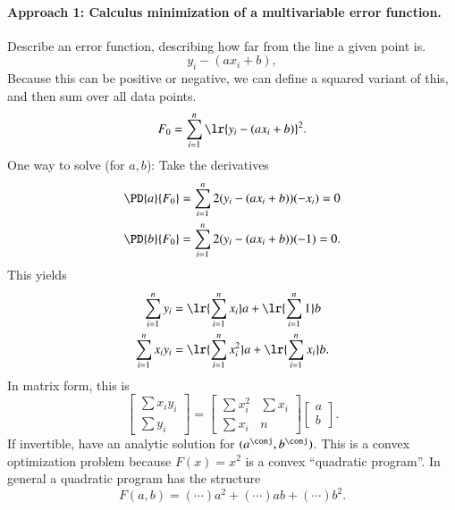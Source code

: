 \paragraph{Approach 1:  Calculus minimization of a multivariable error function.}
Describe an error function, describing how far from the line a given point is.
\begin{equation}\label{eqn:L1introduction:100}
y_i - (a x_i + b),
\end{equation}
Because this can be positive or negative, we can define a squared variant of this, and then sum over all data points.
\begin{equation}\label{eqn:L1introduction:120}
F_0 = \sum_{i=1}^n \lr{ y_i - (a x_i + b) }^2.
\end{equation}
One way to solve (for \( a, b \)): Take the derivatives
\begin{equation}\label{eqn:L1introduction:140}
\begin{aligned}
\PD{a}{F_0} &= \sum_{i=1}^n 2 ( y_i - (a x_i + b) )(-x_i) = 0 \\
\PD{b}{F_0} &= \sum_{i=1}^n 2 ( y_i - (a x_i + b) )(-1) = 0.
\end{aligned}
\end{equation}
%
This yields
\begin{equation}\label{eqn:L1introduction:160}
\begin{aligned}
\sum_{i = 1}^n y_i     &= \lr{\sum_{i = 1}^n x_i} a + \lr{\sum_{i = 1}^n 1} b \\
\sum_{i = 1}^n x_i y_i &= \lr{\sum_{i = 1}^n x_i^2} a + \lr{\sum_{i = 1}^n x_i} b.
\end{aligned}
\end{equation}
In matrix form, this is
\begin{equation}\label{eqn:L1introduction:180}
\begin{bmatrix}
\sum x_i y_i \\
\sum y_i
\end{bmatrix}
=
\begin{bmatrix}
\sum x_i^2 & \sum x_i \\
\sum x_i & n
\end{bmatrix}
\begin{bmatrix}
a \\
b
\end{bmatrix}.
\end{equation}
If invertible, have an analytic solution for \( (a^\conj, b^\conj) \).  This is a convex optimization problem because \( F(x) = x^2 \) is a convex ``quadratic program''.  In general a quadratic program has the structure
\begin{equation}\label{eqn:L1introduction:200}
F(a, b) = (\cdots) a^2 + (\cdots) a b + (\cdots) b^2.
\end{equation}
